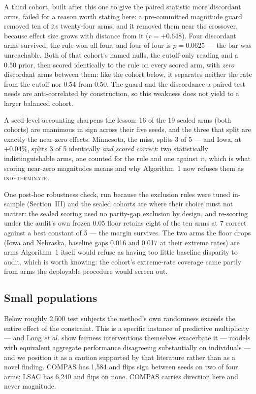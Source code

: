 \documentclass[9pt,conference]{IEEEtran}
\begin{document}
A third cohort, built after this one to give the paired statistic more discordant arms,
failed for a reason worth stating here: a pre-committed magnitude guard removed ten of its
twenty-four arms, and it removed them near the crossover, because effect size grows with
distance from it ($r = +0.648$). Four discordant arms survived, the rule won all four, and
four of four is $p = 0.0625$ --- the bar was unreachable. Both of that cohort's named nulls,
the cutoff-only reading and a 0.50 prior, then scored identically to the rule on every
scored arm, with \emph{zero} discordant arms between them: like the cohort below, it
separates neither the rate from the cutoff nor 0.54 from 0.50. The guard and the
discordance a paired test needs are anti-correlated by construction, so this weakness does
not yield to a larger balanced cohort.

A seed-level accounting sharpens the lesson: 16 of the 19 sealed arms (both cohorts) are
unanimous in sign across their five seeds, and the three that split are exactly the
near-zero effects. Minnesota, the miss, splits 3 of 5 --- and Iowa, at $+0.04\%$,
splits 3 of 5 identically \emph{and scored correct}: two statistically indistinguishable
arms, one counted for the rule and one against it, which is what scoring near-zero
magnitudes means and why Algorithm~1 now refuses them as \textsc{indeterminate}.

One post-hoc robustness check, run because the exclusion rules were tuned in-sample
(Section~III) and the sealed cohorts are where their choice must not matter: the sealed
scoring used no parity-gap exclusion by design, and re-scoring under the audit's own
frozen 0.05 floor retains eight of the ten arms at 7 correct against a best constant of
5 --- the margin survives. The two arms the floor drops (Iowa and Nebraska, baseline gaps
0.016 and 0.017 at their extreme rates) are arms Algorithm~1 itself would refuse as
having too little baseline disparity to audit, which is worth knowing: the cohort's
extreme-rate coverage came partly from arms the deployable procedure would screen out.

\subsection{Small populations}

Below roughly 2{,}500 test subjects the method's own randomness exceeds the entire effect of
the constraint. This is a specific instance of predictive multiplicity
\cite{black2022,long2023} --- and Long \emph{et al.} \cite{long2023} show fairness
interventions themselves exacerbate it ---
models with equivalent aggregate performance disagreeing substantially on individuals --- and
we position it as a caution supported by that literature rather than as a novel finding. COMPAS has 1{,}584 and flips sign between seeds on two of four arms; LSAC has
6{,}240 and flips on none. COMPAS carries direction here and never magnitude.
\end{document}
